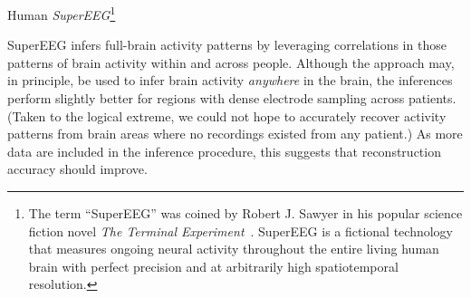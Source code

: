Human \textit{SuperEEG}\footnote{The term ``SuperEEG'' was coined by
    Robert J. Sawyer in his popular science fiction novel \textit{The
      Terminal Experiment}~\cite{Sawy95}.  SuperEEG is a fictional
    technology that measures ongoing
  neural activity throughout the entire living human brain with perfect
  precision and at arbitrarily high spatiotemporal resolution.}


SuperEEG infers full-brain activity patterns by leveraging
correlations in those patterns of brain activity within and across people.  Although
the approach may, in principle, be used to infer brain activity
\textit{anywhere} in the brain, the inferences perform slightly better for
regions with dense electrode sampling across patients.  (Taken to the logical extreme, we could not hope to accurately recover activity patterns from brain areas where no recordings existed from any patient.)   As more data
are included in the inference procedure, this suggests that reconstruction accuracy should improve.


